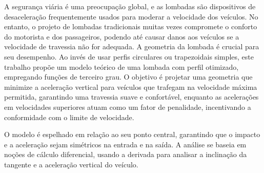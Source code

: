 \documentclass[../resumo.tex]{subfiles}
\begin{document}
	
	A segurança viária é uma preocupação global, e as lombadas são dispositivos de desaceleração
	frequentemente usados para moderar a velocidade dos veículos.
	No entanto, o projeto de lombadas tradicionais muitas vezes compromete o conforto do motorista
	e dos passageiros, podendo até causar danos aos veículos se a velocidade de travessia não for adequada.
	A geometria da lombada é crucial para seu desempenho. Ao invés de usar perfis circulares ou trapezoidais simples,
	este trabalho propõe um modelo teórico de uma lombada com perfil otimizado, empregando funções de terceiro grau.
	O objetivo é projetar uma geometria que minimize a aceleração vertical para veículos que trafegam na velocidade
	máxima permitida, garantindo uma travessia suave e confortável, enquanto as acelerações em velocidades superiores
	atuam como um fator de penalidade, incentivando a conformidade com o limite de velocidade.

	O modelo é espelhado em relação ao seu ponto central, garantindo que o impacto e a aceleração sejam simétricos
	na entrada e na saída. A análise se baseia em noções de cálculo diferencial, usando a derivada para analisar a
	inclinação da tangente e a aceleração vertical do veículo.
\end{document}
